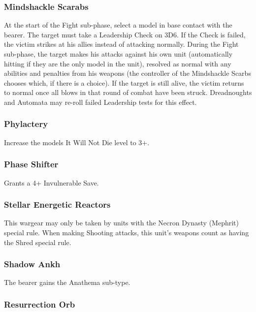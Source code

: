 \subsubsection{Mindshackle Scarabs} \label{Mindshackle Scarabs}

At the start of the Fight sub-phase, select a model in base contact with the bearer. The target must take a Leadership Check on 3D6. If the Check is failed, the victim strikes at his allies instead of attacking normally. During the Fight sub-phase, the target makes his attacks against his own unit (automatically hitting if they are the only model in the unit), resolved as normal with any abilities and penalties from his weapons (the controller of the Mindshackle Scarbs chooses which, if there is a choice). If the target is still alive, the victim returns to normal once all blows in that round of combat have been struck. Dreadnoughts and Automata may re-roll failed Leadership tests for this effect.

\subsubsection{Phylactery} \label{Phylactery}

Increase the models It Will Not Die level to 3+.

\subsubsection{Phase Shifter} \label{Phase Shifter}

Grants a 4+ Invulnerable Save.

\subsubsection{Stellar Energetic Reactors} \label{Stellar Energetic Reactors}

This wargear may only be taken by units with the Necron Dynasty (Mephrit) special rule. When making Shooting attacks, this unit's weapons count as having the Shred special rule.

\subsubsection{Shadow Ankh} \label{Shadow Ankh}

The bearer gains the Anathema sub-type.

\subsubsection{Resurrection Orb} \label{Resurrection Orb}

